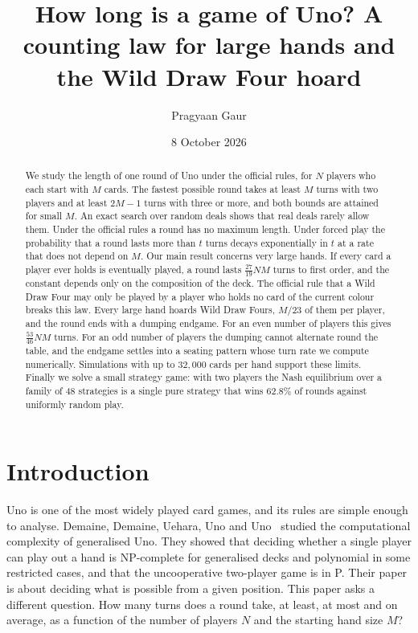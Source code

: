 \documentclass[11pt]{amsart}
\title[How long is a game of Uno?]{How long is a game of Uno? A counting law for large hands and the Wild Draw Four hoard}
\author{Pragyaan Gaur}
\date{8 October 2026}
\theoremstyle{remark}
\begin{document}
\begin{abstract}
We study the length of one round of Uno under the official rules, for $N$ players who each start with $M$ cards. The fastest possible round takes at least $M$ turns with two players and at least $2M-1$ turns with three or more, and both bounds are attained for small $M$. An exact search over random deals shows that real deals rarely allow them. Under the official rules a round has no maximum length. Under forced play the probability that a round lasts more than $t$ turns decays exponentially in $t$ at a rate that does not depend on $M$. Our main result concerns very large hands. If every card a player ever holds is eventually played, a round lasts $\frac{27}{19}NM$ turns to first order, and the constant depends only on the composition of the deck. The official rule that a Wild Draw Four may only be played by a player who holds no card of the current colour breaks this law. Every large hand hoards Wild Draw Fours, $M/23$ of them per player, and the round ends with a dumping endgame. For an even number of players this gives $\frac{53}{46}NM$ turns. For an odd number of players the dumping cannot alternate round the table, and the endgame settles into a seating pattern whose turn rate we compute numerically. Simulations with up to $32{,}000$ cards per hand support these limits. Finally we solve a small strategy game: with two players the Nash equilibrium over a family of 48 strategies is a single pure strategy that wins 62.8\% of rounds against uniformly random play.
\end{abstract}

\maketitle

\section{Introduction}

Uno is one of the most widely played card games, and its rules are simple enough to analyse. Demaine, Demaine, Uehara, Uno and Uno~\cite{demaine2014} studied the computational complexity of generalised Uno. They showed that deciding whether a single player can play out a hand is NP-complete for generalised decks and polynomial in some restricted cases, and that the uncooperative two-player game is in P. Their paper is about deciding what is possible from a given position. This paper asks a different question. How many turns does a round take, at least, at most and on average, as a function of the number of players $N$ and the starting hand size $M$?
\end{document}
